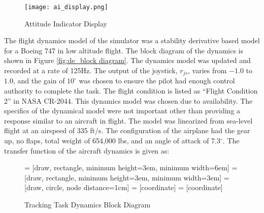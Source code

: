\begin{figure}
    \centering
    \texttt{[image: ai\_display.png]}
    \caption{Attitude Indicator Display}
    \label{fig:de_ai_display}
\end{figure}

The flight dynamics model of the simulator was a stability derivative based model for a Boeing 747 in low altitude flight.
The block diagram of the dynamics is shown in Figure \ref{fig:de_block diagram}.
The dynamics model was updated and recorded at a rate of 125Hz.
The output of the joystick, $r_{js}$, varies from $-1.0$ to $1.0$, and the gain of $10^{\circ}$ was chosen to ensure the pilot had enough control authority to complete the task.
The flight condition is listed as ``Flight Condition 2'' in NASA CR-2044\cite{NASACR}.
This dynamics model was chosen due to availability.
The specifics of the dynamical model were not important other than providing a response similar to an aircraft in flight.
The model was linearized from sea-level flight at an airspeed of 335 ft/s.
The configuration of the airplane had the gear up, no flaps, total weight of 654,000 lbs, and an angle of attack of 7.3$^{\circ}$.
The transfer function of the aircraft dynamics is given as:

\begin{figure}
    \centering
    \centering
     = [draw, rectangle, minimum height=3em, minimum width=6em]
     = [draw, rectangle, minimum height=3em, minimum width=3em]
     = [draw, circle, node distance=1cm]
     = [coordinate]
     = [coordinate]
    \medskip
    \caption{Tracking Task Dynamics Block Diagram}
    \label{fig:de_block_diagram}
\end{figure}

